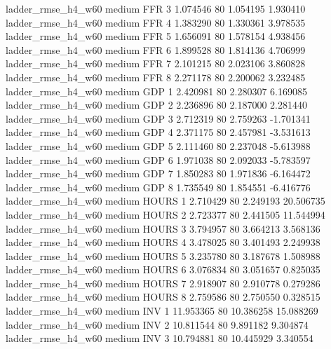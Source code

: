  ladder_rmse_h4_w60     medium      FFR                 3  1.074546 80       1.054195           1.930410
 ladder_rmse_h4_w60     medium      FFR                 4  1.383290 80       1.330361           3.978535
 ladder_rmse_h4_w60     medium      FFR                 5  1.656091 80       1.578154           4.938456
 ladder_rmse_h4_w60     medium      FFR                 6  1.899528 80       1.814136           4.706999
 ladder_rmse_h4_w60     medium      FFR                 7  2.101215 80       2.023106           3.860828
 ladder_rmse_h4_w60     medium      FFR                 8  2.271178 80       2.200062           3.232485
 ladder_rmse_h4_w60     medium      GDP                 1  2.420981 80       2.280307           6.169085
 ladder_rmse_h4_w60     medium      GDP                 2  2.236896 80       2.187000           2.281440
 ladder_rmse_h4_w60     medium      GDP                 3  2.712319 80       2.759263          -1.701341
 ladder_rmse_h4_w60     medium      GDP                 4  2.371175 80       2.457981          -3.531613
 ladder_rmse_h4_w60     medium      GDP                 5  2.111460 80       2.237048          -5.613988
 ladder_rmse_h4_w60     medium      GDP                 6  1.971038 80       2.092033          -5.783597
 ladder_rmse_h4_w60     medium      GDP                 7  1.850283 80       1.971836          -6.164472
 ladder_rmse_h4_w60     medium      GDP                 8  1.735549 80       1.854551          -6.416776
 ladder_rmse_h4_w60     medium    HOURS                 1  2.710429 80       2.249193          20.506735
 ladder_rmse_h4_w60     medium    HOURS                 2  2.723377 80       2.441505          11.544994
 ladder_rmse_h4_w60     medium    HOURS                 3  3.794957 80       3.664213           3.568136
 ladder_rmse_h4_w60     medium    HOURS                 4  3.478025 80       3.401493           2.249938
 ladder_rmse_h4_w60     medium    HOURS                 5  3.235780 80       3.187678           1.508988
 ladder_rmse_h4_w60     medium    HOURS                 6  3.076834 80       3.051657           0.825035
 ladder_rmse_h4_w60     medium    HOURS                 7  2.918907 80       2.910778           0.279286
 ladder_rmse_h4_w60     medium    HOURS                 8  2.759586 80       2.750550           0.328515
 ladder_rmse_h4_w60     medium      INV                 1 11.953365 80      10.386258          15.088269
 ladder_rmse_h4_w60     medium      INV                 2 10.811544 80       9.891182           9.304874
 ladder_rmse_h4_w60     medium      INV                 3 10.794881 80      10.445929           3.340554
